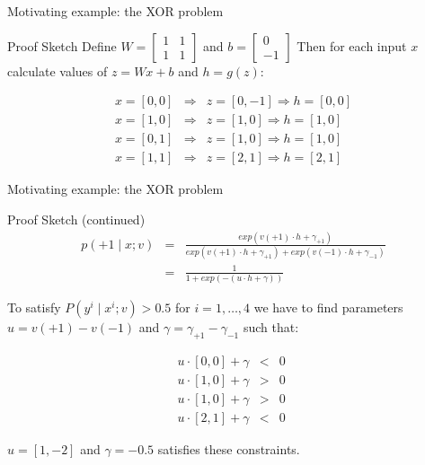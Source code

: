 \begin{frame}{Motivating example: the XOR problem}
\begin{block}{Proof Sketch}
Define $W = \begin{bmatrix}
 1 & 1 \\
 1 & 1 
 \end{bmatrix}$ 
and $b = \begin{bmatrix} 0 \\ -1 \end{bmatrix}$
\pause
Then for each input $x$ calculate values of $z = Wx+b$ and $h=g(z)$:

\begin{eqnarray*}
x = [0,0] &\Rightarrow& z = [0,-1] \Rightarrow h = [0,0] \\
x = [1,0] &\Rightarrow& z = [1,0] \Rightarrow h = [1,0] \\
x = [0,1] &\Rightarrow& z = [1,0] \Rightarrow h = [1,0] \\
x = [1,1] &\Rightarrow& z = [2,1] \Rightarrow h = [2,1] 
\end{eqnarray*}
\end{block}
\end{frame}

\begin{frame}{Motivating example: the XOR problem}
\begin{block}{Proof Sketch (continued)}
\begin{eqnarray*}
p(+1 \mid x; v) &=& \frac{exp(v(+1) \cdot h  + \gamma_{+1})}{exp(v(+1) \cdot h  + \gamma_{+1}) + exp(v(-1) \cdot h + \gamma_{-1})} \\
&=& \frac{1}{1 + exp(-(u \cdot h + \gamma))}
\end{eqnarray*}

\pause
To satisfy $P(y^i \mid x^i; v) > 0.5$ for $i = 1,\ldots,4$
we have to find parameters $u = v(+1) - v(-1)$ and $\gamma = \gamma_{+1} - \gamma_{-1}$
such that:

\begin{eqnarray*}
u \cdot [0,0] + \gamma &<& 0 \\
u \cdot [1,0] + \gamma &>& 0 \\
u \cdot [1,0] + \gamma &>& 0 \\
u \cdot [2,1] + \gamma &<& 0 \end{eqnarray*}

$u = [1, -2]$ and $\gamma = -0.5$ satisfies these constraints.
\end{block}
\end{frame}




 
